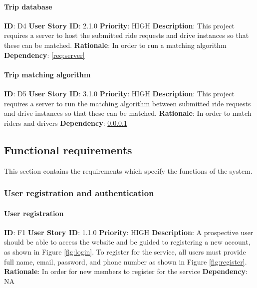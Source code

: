 \documentclass{article}
\begin{document}
\paragraph{Trip database}\label{req:tripDatabase}
\textbf{ID}: D4\newline
\textbf{User Story ID}: 2.1.0\newline
\textbf{Priority}: HIGH\newline
\textbf{Description}: This project requires a server to host the submitted ride requests and drive instances so that these can be matched.\newline
\textbf{Rationale}: In order to run a matching algorithm\newline
\textbf{Dependency}: \ref{req:server}

\paragraph{Trip matching algorithm}\label{req:matchAlgorithm}
\textbf{ID}: D5\newline
\textbf{User Story ID}: 3.1.0\newline
\textbf{Priority}: HIGH\newline
\textbf{Description}: This project requires a server to run the matching algorithm between submitted ride requests and drive instances so that these can be matched.\newline
\textbf{Rationale}: In order to match riders and drivers\newline
\textbf{Dependency}: \ref{req:tripDatabase}


\subsection{Functional requirements}
This section contains the requirements which specify the functions of the system.


\subsubsection{User registration and authentication}

\paragraph{User registration}\label{req:registration}
\textbf{ID}: F1\newline
\textbf{User Story ID}: 1.1.0\newline
\textbf{Priority}: HIGH\newline
\textbf{Description}: A prospective user should be able to access the website and be guided to registering a new account, as shown in Figure \ref{fig:login}. To register for the service, all users must provide full name, email, password, and phone number as shown in Figure \ref{fig:register}.\newline
\textbf{Rationale}: In order for new members to register for the service\newline
\textbf{Dependency}: NA
\end{document}
